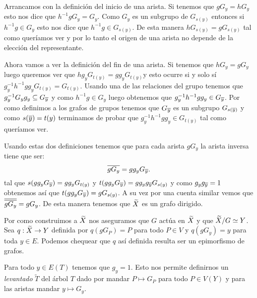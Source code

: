 \documentclass[tesis.tex]{subfiles}
\begin{document}
Arrancamos con la definición del inicio de una arista.
Si tenemos que $gG_{y} = hG_{y}$ esto nos dice que $h^{-1}gG_{y} = G_{y}$.
Como $G_{y}$ es un subgrupo de $G_{s(y)}$ entonces si $h^{-1}g \in G_y$ esto nos dice que $h^{-1}g \in G_{s(y)}$.
De esta manera $hG_{s(y)} = gG_{s(y)}$ tal como queríamos ver y por lo tanto el origen de una arista no depende de la elección del representante.


Ahora vamos a ver la definición del fin de una arista.
Si tenemos que $hG_{y} = gG_{y}$ luego queremos ver que $hg_{y}G_{t(y)} = gg_{y}G_{t(y)}$y esto ocurre si y solo sí $g^{-1}_y h^{-1}g g_{y} G_{t(y)} = G_{t(y)}$.
Usando una de las relaciones del grupo tenemos que $g_{y}^{-1} G_{y} g_{y} \subseteq G_{\overline y}$ y como $h^{-1}g \in G_{y}$ luego obtenemos que $g^{-1}_y h^{-1}g g_{y} \in G_{\overline y}$.
Por como definimos a los grafos de grupos tenemos que $G_{\overline y}$ es un subgrupo $G_{s(\overline y)}$ y como $s(\overline y) = t(y)$ terminamos de probar que $g^{-1}_y h^{-1}g g_{y} \in G_{t(y)}$ tal como queríamos ver.


Usando estas dos definiciones tenemos que para cada arista $gG_{y}$ la arista inversa tiene que ser:
\[
\overline{gG_{y}} = gg_{y} G_{\overline y}.
\]
tal que $s(gg_{y}G_{\overline y}) = gg_{y}G_{t(y)}$ y $t(gg_{y}G_{\overline y}) = gg_{y}g_{\overline y}G_{s(y)}$ y como $g_{y}g_{\overline y} = 1$ obtenemos así que $t(gg_{y}G_{\overline y}) = gG_{s(y)}$.
A su vez por una cuenta similar vemos que $\overline{\overline{gG_{y}}} = gG_{y}$.
De esta manera tenemos que $\widetilde X$ es un grafo dirigido.

Por como construimos a $\widetilde X$ nos aseguramos que $G$ actúa en $\widetilde X$ y que $\widetilde X / G \simeq Y$.
Sea $q:\widetilde X \to Y$ definida por $q(gG_{P}) = P$ para todo $P \in V$ y $q(gG_{y}) = y$ para toda $y \in E$.
Podemos chequear que $q$ así definida resulta ser un epimorfismo de grafos.

\begin{obs}\label{obs_levantado_arbol}
	Para todo $y \in E(T)$ tenemos que $g_y=1$. 
	Esto nos permite definirnos un \emph{levantado} $\widetilde{T}$ del árbol $T$ dado por mandar $P \mapsto  G_P$ para todo $P \in V(Y)$ y para las aristas mandar $y \mapsto  G_y$. 
\end{obs}
\end{document}
